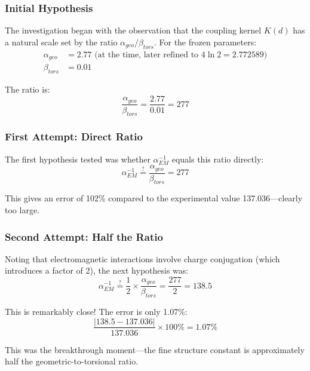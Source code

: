 \documentclass[11pt, a4paper]{article}
\begin{document}
\subsubsection{Initial Hypothesis}

The investigation began with the observation that the coupling kernel $K(d)$ has a natural scale set by the ratio $\alpha_{geo}/\beta_{tors}$. For the frozen parameters:
\begin{align}
\alpha_{geo} &= 2.77 \text{ (at the time, later refined to } 4\ln 2 = 2.772589\text{)}\\
\beta_{tors} &= 0.01
\end{align}

The ratio is:
\begin{equation}
\frac{\alpha_{geo}}{\beta_{tors}} = \frac{2.77}{0.01} = 277
\end{equation}

\subsubsection{First Attempt: Direct Ratio}

The first hypothesis tested was whether $\alpha_{EM}^{-1}$ equals this ratio directly:
\begin{equation}
\alpha_{EM}^{-1} \stackrel{?}{=} \frac{\alpha_{geo}}{\beta_{tors}} = 277
\end{equation}

This gives an error of 102\% compared to the experimental value 137.036—clearly too large.

\subsubsection{Second Attempt: Half the Ratio}

Noting that electromagnetic interactions involve charge conjugation (which introduces a factor of 2), the next hypothesis was:
\begin{equation}
\alpha_{EM}^{-1} \stackrel{?}{=} \frac{1}{2} \times \frac{\alpha_{geo}}{\beta_{tors}} = \frac{277}{2} = 138.5
\end{equation}

This is remarkably close! The error is only 1.07\%:
\begin{equation}
\frac{|138.5 - 137.036|}{137.036} \times 100\% = 1.07\%
\end{equation}

This was the breakthrough moment—the fine structure constant is approximately half the geometric-to-torsional ratio.
\end{document}
